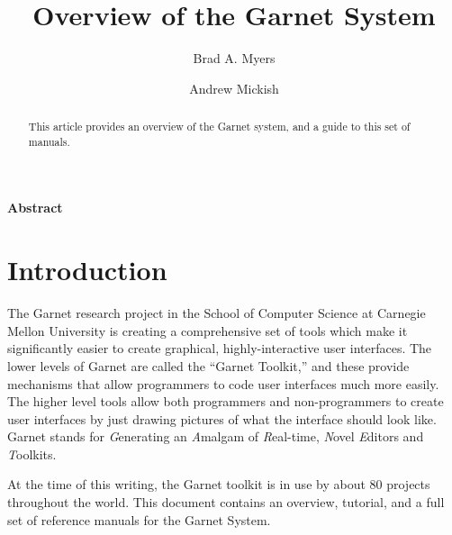 \documentclass{report}
\begin{document}
\begin{titlepage}
  \vspace{0.6 inch} \title{Overview of the Garnet System}
  
  \author{Brad A. Myers \and Andrew Mickish}

\begin{abstract}
  This article provides an overview of the Garnet system, and a guide
  to this set of manuals.
\end{abstract}
{\bf Abstract}

\vspace{0.7 inch} 
\end{titlepage}






%
\section{Introduction}
The Garnet research project in the School of Computer Science at
Carnegie Mellon University is creating a comprehensive set of tools
which make it significantly easier to create graphical,
highly-interactive user interfaces.  The lower levels of Garnet are
called the ``Garnet Toolkit,'' and these provide mechanisms that allow
programmers to code user interfaces much more easily.  The higher
level tools allow both programmers and non-programmers to create user
interfaces by just drawing pictures of what the interface should look
like.  Garnet stands for {\it G}enerating an {\it A}malgam of {\it
  R}eal-time, {\it N}ovel {\it E}ditors and {\it T}oolkits.

At the time of this writing, the Garnet toolkit is in use by about 80
projects throughout the world.  This document contains an overview,
tutorial, and a full set of reference manuals for the Garnet System.
\end{document}
